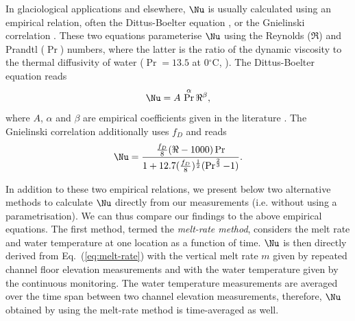 In glaciological applications and elsewhere, $\Nu$ is usually calculated using an empirical relation, often the Dittus-Boelter equation \citep[e.g.][]{Clarke2003,Spring&Hutter1981,Nye1976}, or the Gnielinski correlation \citep[e.g.][]{Ancey&al2019}. These two equations parameterise $\Nu$ using the Reynolds ($\Re$) and Prandtl ($\Pr$) numbers, where the latter is the ratio of the dynamic viscosity to the thermal diffusivity of water ($\Pr = 13.5$ at 0$^\circ$C, \cite{Clarke2003}).
The Dittus-Boelter equation reads
\begin{equation}
    \Nu = A\, \Pr^\alpha \Re^\beta,
    \label{eq:DB}
\end{equation}
%
where $A$, $\alpha$ and $\beta$ are empirical coefficients given in the literature  \citep{Incropera&al2007}.
The Gnielinski correlation additionally uses $f_D$ and reads
%
\begin{equation}
    \Nu =  \frac{\frac{f_D}{8}(\Re - 1000)\Pr}{1 + 12.7(\frac{f_D}{8})^\frac{1}{2}(\Pr^\frac{2}{3}-1)}.
    \label{eq:Gnielinski}
\end{equation}

In addition to these two empirical relations, we present below two alternative methods to calculate $\Nu$ directly from our measurements (i.e. without using a parametrisation). We can thus compare our findings to the above empirical equations.
%
The first method, termed the {\it melt-rate method}, considers the melt rate and water temperature at one location as a function of time. $\Nu$ is then directly derived from Eq.~(\ref{eq:melt-rate}) with the vertical melt rate $m$ given by repeated channel floor elevation measurements and with the water temperature given by the continuous monitoring. The water temperature measurements are averaged over the time span between two channel elevation measurements, therefore, $\Nu$ obtained by using the melt-rate method is time-averaged as well.

